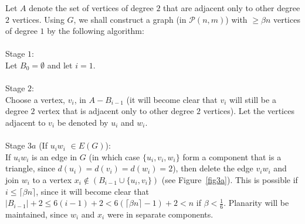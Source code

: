 \documentclass{article}
\newtheorem{Proof of Theorem}{Proof of Theorem}
\begin{document}
Let $A$ denote the set of vertices of degree $2$ that are adjacent only to other degree $2$ vertices.
Using $G$, we shall construct a graph (in $\mathcal{P}(n,m)$)
with $ \geq \beta n$ vertices of degree $1$ by the following algorithm: \\
\\
Stage $1$: \\
Let $B_{0} = \emptyset$ and let $i=1$. \\
\\
Stage $2$: \\
Choose a vertex, $v_{i}$, in $A-B_{i-1}$ 
(it will become clear that $v_{i}$ will still be a degree $2$ vertex that is adjacent only to other degree $2$ vertices).
Let the vertices adjacent to $v_{i}$ be denoted by $u_{i}$ and $w_{i}$. \\
\\
Stage $3a$ (If $u_{i}w_{i}$ $\in E(G)$): \\
If $u_{i}w_{i}$ is an edge in $G$ (in which case $\{ u_{i}, v_{i}, w_{i} \}$ form a component that is a triangle, 
since $d(u_{i}) = d(v_{i}) = d(w_{i}) =2$), 
then delete the edge $v_{i}w_{i}$ and join $w_{i}$ to a vertex $x_{i} \notin (B_{i-1} \cup \{ u_{i}, v_{i} \} )$
(see Figure~\ref{fig3a}).
This is possible if $i \leq \lceil \beta n \rceil$,
since it will become clear that $|B_{i-1}| + 2 \leq 6(i-1) +2 <6( \lceil \beta n \rceil -1) +2 < n$
if $\beta < \frac{1}{6}$.
Planarity will be maintained, since $w_{i}$ and $x_{i}$ were in separate components. 
\end{document}
